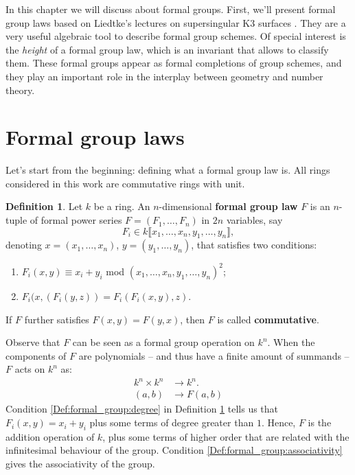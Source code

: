 \documentclass{report}
\theoremstyle{definition}
\newtheorem{definition}[equation]{Definition}
\begin{document}
In this chapter we will discuss about formal groups. First, we'll present formal group laws based on Liedtke's lectures on supersingular K3 surfaces \cite[Section~6.1]{liedtke2016lectures}. They are a very useful algebraic tool to describe formal group schemes. Of special interest is the \emph{height} of a formal group law, which is an invariant that allows to classify them. These formal groups appear as formal completions of group schemes, and they play an important role in the interplay between geometry and number theory.

\section{Formal group laws}

Let's start from the beginning: defining what a formal group law is. All rings considered in this work are commutative rings with unit.

\begin{definition}
\label{Def:formal_group}
Let $k$ be a ring. An $n$-dimensional \textbf{formal group law} $F$ is an $n$-tuple of formal power series $F=(F_1,\ldots,F_n)$ in $2n$ variables, say
\[F_i\in k\llbracket x_1,\ldots,x_n,y_1,\ldots,y_n\rrbracket,\]
denoting $x=(x_1,\ldots,x_n)$, $y=(y_1,\ldots,y_n)$, that satisfies two conditions:
\begin{enumerate}
\item\label{Def:formal_group:degree} $F_i(x,y)\equiv x_i+y_i$ mod $(x_1,\ldots,x_n,y_1,\ldots,y_n)^2$;
\item\label{Def:formal_group:associativity} $F_i(x,(F_i(y,z))=F_i(F_i(x,y),z)$.
\end{enumerate}

If $F$ further satisfies $F(x,y)=F(y,x)$, then $F$ is called \textbf{commutative}.
\end{definition}

Observe that $F$ can be seen as a formal group operation on $k^n$. When the components of $F$ are polynomials -- and thus have a finite amount of summands -- $F$ acts on $k^n$ as:
\begin{align*}
k^n\times k^n&\longrightarrow k^n.\\
(a,b)&\longrightarrow F(a,b)
\end{align*}
Condition \ref{Def:formal_group:degree} in Definition \ref{Def:formal_group} tells us that $F_i(x,y)=x_i+y_i$ plus some terms of degree greater than $1$. Hence, $F$ is the addition operation of $k$, plus some terms of higher order that are related with the infinitesimal behaviour of the group. Condition \ref{Def:formal_group:associativity} gives the associativity of the group.
\end{document}
